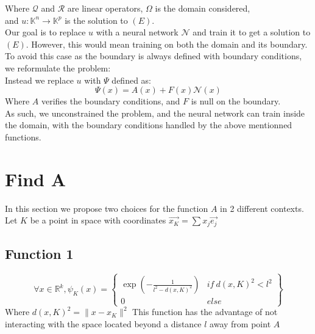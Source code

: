 Where $\mathcal{Q}$ and $\mathcal{R}$ are linear operators, $\Omega$ is the domain considered,\\
and $u : \mathbb{K}^n \rightarrow \mathbb{K}^p$ is the solution to $(E)$.\\

Our goal is to replace $u$ with a neural network $\mathcal{N}$ and train it to get a solution to $(E)$.
However, this would mean training on both the domain and its boundary. To avoid this case as the boundary is always defined with boundary conditions, we reformulate the problem:\\

Instead we replace $u$ with $\Psi$ defined as:
\begin{equation}
    \Psi(x) = A(x) + F(x)\mathcal{N}(x)
\end{equation}
Where $A$ verifies the boundary conditions, and $F$ is null on the boundary.\\
As such, we unconstrained the problem, and the neural network can train inside the domain, with the boundary conditions handled by the above mentionned functions.




\section{Find A}
In this section we propose two choices for the function $A$ in 2 different contexts.\\
Let $K$ be a point in space with coordinates 
\begin{math}
\Vec{x_K} = \sum x_j\Vec{e_j}
\end{math}

\subsection{Function 1}
\begin{equation*}
    \forall x \in \mathbb{R}^k, \psi_K(x)=
    \left\{
    \begin{matrix}
    \exp \left( -\frac{1}{l^2 - d(x,K)^2} \right) & if \ d(x,K)^2<l^2\\
    0 & else
    \end{matrix}
    \right\}
\end{equation*}
Where 
\begin{math}
    d(x,K)^2 = \lVert x - x_K \rVert^2
\end{math}
\newline
This function has the advantage of not interacting with the space located beyond a distance $l$ away from point $A$

